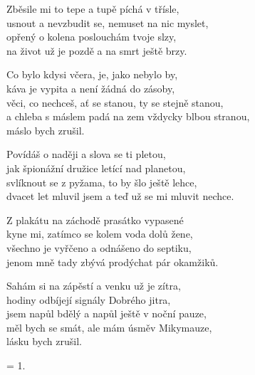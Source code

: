 \ve{}
Zběsile mi to tepe a tupě píchá v třísle,\\
usnout a nevzbudit se, nemuset na nic myslet,\\
opřený o kolena poslouchám tvoje slzy,\\
na život už je pozdě a na smrt ještě brzy.

\cho{}
Co bylo kdysi včera, je, jako nebylo by,\\
káva je vypita a není žádná do zásoby,\\
věci, co nechceš, ať se stanou, ty se stejně stanou,\\
a chleba s máslem padá na zem vždycky blbou stranou,\\
máslo bych zrušil.

\ve{}
Povídáš o naději a slova se ti pletou,\\
jak špionážní družice letící nad planetou,\\
svlíknout se z pyžama, to by šlo ještě lehce,\\
dvacet let mluvil jsem a teď už se mi mluvit nechce.

\ve{}
Z plakátu na záchodě prasátko vypasené\\
kyne mi, zatímco se kolem voda dolů žene,\\
všechno je vyřčeno a odnášeno do septiku,\\
jenom mně tady zbývá prodýchat pár okamžiků.

\cho{}
Sahám si na zápěstí a venku už je zítra,\\
hodiny odbíjejí signály Dobrého jitra,\\
jsem napůl bdělý a napůl ještě v noční pauze,\\
měl bych se smát, ale mám úsměv Mikymauze,\\
lásku bych zrušil.

\ve{}
= 1.

\esong{}